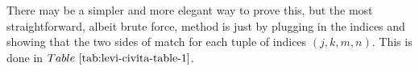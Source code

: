 \def\duedate{09/30/22}
\def\HWnum{3}

\usepackage{longtable}


    

There may be a simpler and more elegant way to prove this, but the most straightforward, albeit brute force, method is just by plugging in the indices and showing that the two sides of  match for each tuple of indices $(j,k,m,n)$.
This is done in $\tref{levi-civita-table-1}$.

